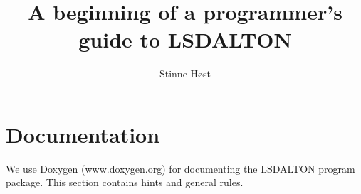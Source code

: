 \documentclass[preprint,aps]{revtex4}
\begin{document}
\title{\Large \bf A beginning of a programmer's guide to LSDALTON} 

\author{Stinne H{\o}st}
\maketitle
\newpage
\section{Documentation}
We use Doxygen (www.doxygen.org) for documenting the LSDALTON program package. This section contains hints and general rules.
\end{document}
